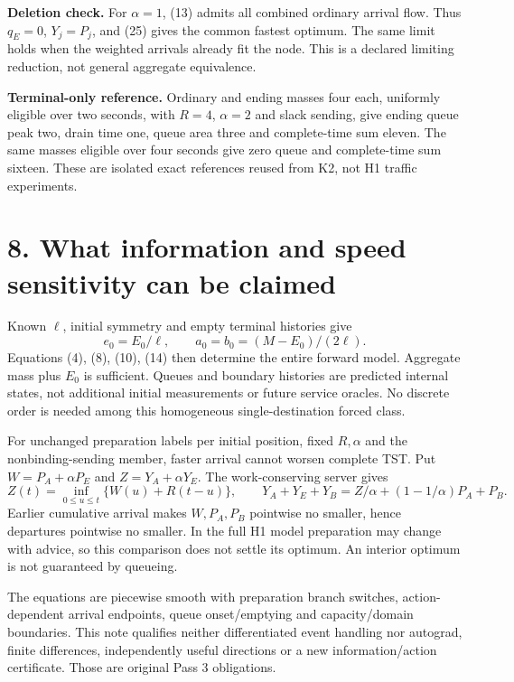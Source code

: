 \documentclass[11pt,a4paper]{article}
\begin{document}
\textbf{Deletion check.} For $\alpha=1$, (13) admits all combined ordinary
arrival flow. Thus $q_E=0$, $Y_j=P_j$, and (25) gives the common fastest optimum.
The same limit holds when the weighted arrivals already fit the node.
This is a declared limiting reduction, not general aggregate equivalence.

\textbf{Terminal-only reference.} Ordinary and ending masses four each,
uniformly eligible over two seconds, with $R=4$, $\alpha=2$ and slack
sending, give ending queue peak two, drain time one, queue area three and
complete-time sum eleven. The same masses eligible over four seconds give
zero queue and complete-time sum sixteen. These are isolated exact
references reused from K2, not H1 traffic experiments.

\section*{8. What information and speed sensitivity can be claimed}
Known $\ell$, initial symmetry and empty terminal histories give
\[
 e_0=E_0/\ell,\qquad a_0=b_0=(M-E_0)/(2\ell).
 \tag{26}
\]
Equations (4), (8), (10), (14) then determine the entire forward model.
Aggregate mass plus $E_0$ is sufficient. Queues and boundary histories are
predicted internal states, not additional initial measurements or future
service oracles. No discrete order is needed among this homogeneous
single-destination forced class.

For unchanged preparation labels per initial position, fixed $R,\alpha$
and the nonbinding-sending member, faster arrival cannot worsen complete
TST. Put $W=P_A+\alpha P_E$ and $Z=Y_A+\alpha Y_E$.
The work-conserving server gives
\[
 Z(t)=\inf_{0\leq u\leq t}\{W(u)+R(t-u)\},\qquad
 Y_A+Y_E+Y_B=Z/\alpha+(1-1/\alpha)P_A+P_B.
 \tag{27}
\]
Earlier cumulative arrival makes $W,P_A,P_B$ pointwise no smaller, hence
departures pointwise no smaller. In the full H1 model preparation may change
with advice, so this comparison does not settle its optimum.
An interior optimum is not guaranteed by queueing.

The equations are piecewise smooth with preparation branch switches,
action-dependent arrival endpoints, queue onset/emptying and capacity/domain
boundaries. This note qualifies neither differentiated event handling nor
autograd, finite differences, independently useful directions or a new
information/action certificate. Those are original Pass 3 obligations.
\end{document}
